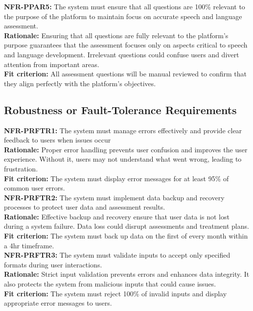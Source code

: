 \documentclass[12pt]{article}
\begin{document}
\noindent\textbf{NFR-PPAR5: }The system must ensure that all questions are 100\% relevant to the purpose of the platform to maintain focus on accurate speech and language assessment.\\
\textbf{Rationale: }Ensuring that all questions are fully relevant to the platform’s purpose guarantees that the assessment focuses only on aspects critical to speech and language development. Irrelevant questions could confuse users and divert attention from important areas.\\
\textbf{Fit criterion: }All assessment questions will be manual reviewed to confirm that they align perfectly with the platform's objectives.\\

\subsection{Robustness or Fault-Tolerance Requirements}

\noindent\textbf{NFR-PRFTR1: }The system must manage errors effectively and provide clear feedback to users when issues occur\\
\textbf{Rationale: }Proper error handling prevents user confusion and improves the user experience. Without it, users may not understand what went wrong, leading to frustration.\\
\textbf{Fit criterion: }The system must display error messages for at least 95\% of common user errors.\\

\noindent\textbf{NFR-PRFTR2: }The system must implement data backup and recovery processes to protect user data and assessment results.\\
\textbf{Rationale: }Effective backup and recovery ensure that user data is not lost during a system failure. Data loss could disrupt assessments and treatment plans.\\
\textbf{Fit criterion: }The system must back up data on the first of every month within a 4hr timeframe.\\

\noindent\textbf{NFR-PRFTR3: }The system must validate inputs to accept only specified formats during user interactions.\\
\textbf{Rationale: }Strict input validation prevents errors and enhances data integrity. It also protects the system from malicious inputs that could cause issues.\\
\textbf{Fit criterion: }The system must reject 100\% of invalid inputs and display appropriate error messages to users.\\
\end{document}
